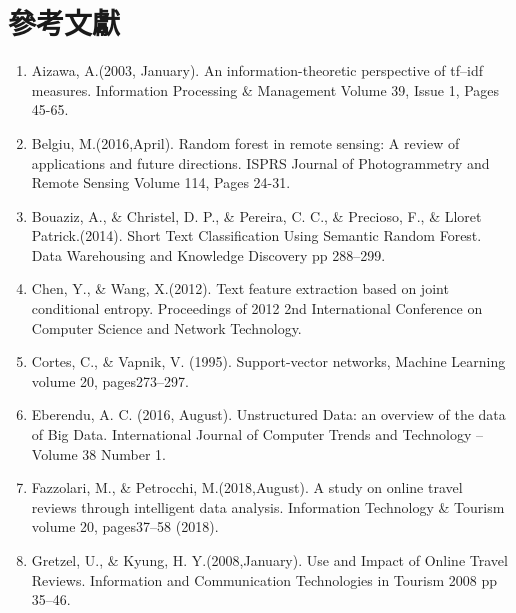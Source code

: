 %
%


 
\chapter*{參考文獻}

\begin{enumerate}
\renewcommand{\labelenumi}{[\theenumi]}

\item Aizawa, A.(2003, January). An information-theoretic perspective of tf–idf measures. Information Processing \& Management Volume 39, Issue 1, Pages 45-65.

\item Belgiu, M.(2016,April). Random forest in remote sensing: A review of applications and future directions. ISPRS Journal of Photogrammetry and Remote Sensing Volume 114, Pages 24-31.

\item Bouaziz, A., \& Christel, D. P., \& Pereira, C. C., \& Precioso, F., \& Lloret Patrick.(2014). Short Text Classification Using Semantic Random Forest. Data Warehousing and Knowledge Discovery pp 288–299.

\item Chen, Y., \& Wang, X.(2012). Text feature extraction based on joint conditional entropy. Proceedings of 2012 2nd International Conference on Computer Science and Network Technology.

\item Cortes, C., \& Vapnik, V. (1995). Support-vector networks, Machine Learning volume 20, pages273–297.

\item Eberendu, A. C. (2016, August). Unstructured Data: an overview of the data of Big Data. International Journal of Computer Trends and Technology – Volume 38 Number 1.

\newpage

\item Fazzolari, M., \& Petrocchi, M.(2018,August). A study on online travel reviews through intelligent data analysis. Information Technology \& Tourism volume 20, pages37–58 (2018). 

\item Gretzel, U., \& Kyung, H. Y.(2008,January). Use and Impact of Online Travel Reviews. Information and Communication Technologies in Tourism 2008 pp 35–46.


\end{enumerate}
